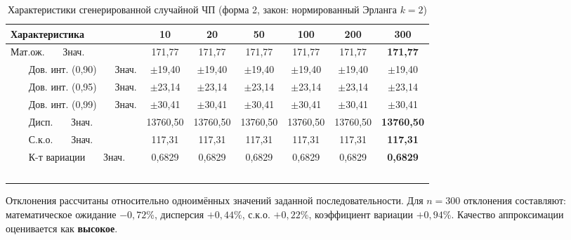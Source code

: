 \documentclass[a4paper,12pt]{article}
\begin{document}
\begin{table}[H]
\centering
\small
\caption{Характеристики сгенерированной случайной ЧП (форма 2, закон: нормированный Эрланга $k=2$)}
\label{tab:form2}
\begin{tabular}{l|cccccc}
\toprule
\textbf{Характеристика} & \textbf{10} & \textbf{20} & \textbf{50} & \textbf{100} & \textbf{200} & \textbf{300} \\
\midrule
Мат.ож. \ \ \ Знач. & 171,77 & 171,77 & 171,77 & 171,77 & 171,77 & \textbf{171,77} \\
\ \ \ %
Дов. инт. (0,90) \ \ \ Знач. & $\pm$19,40 & $\pm$19,40 & $\pm$19,40 & $\pm$19,40 & $\pm$19,40 & $\pm$19,40 \\
\ \ \ %
Дов. инт. (0,95) \ \ \ Знач. & $\pm$23,14 & $\pm$23,14 & $\pm$23,14 & $\pm$23,14 & $\pm$23,14 & $\pm$23,14 \\
\ \ \ %
Дов. инт. (0,99) \ \ \ Знач. & $\pm$30,41 & $\pm$30,41 & $\pm$30,41 & $\pm$30,41 & $\pm$30,41 & $\pm$30,41 \\
\ \ \ %
Дисп. \ \ \ Знач. & 13760,50 & 13760,50 & 13760,50 & 13760,50 & 13760,50 & \textbf{13760,50} \\
\ \ \ %
С.к.о. \ \ \ Знач. & 117,31 & 117,31 & 117,31 & 117,31 & 117,31 & \textbf{117,31} \\
\ \ \ %
К-т вариации \ \ \ Знач. & 0,6829 & 0,6829 & 0,6829 & 0,6829 & 0,6829 & \textbf{0,6829} \\
\ \ \ %
\bottomrule
\end{tabular}
\end{table}

Отклонения рассчитаны относительно одноимённых значений заданной последовательности. Для $n=300$ отклонения составляют: математическое ожидание $-0{,}72$\%, дисперсия $+0{,}44$\%, с.к.о. $+0{,}22$\%, коэффициент вариации $+0{,}94$\%. Качество аппроксимации оценивается как \textbf{высокое}.
\end{document}
